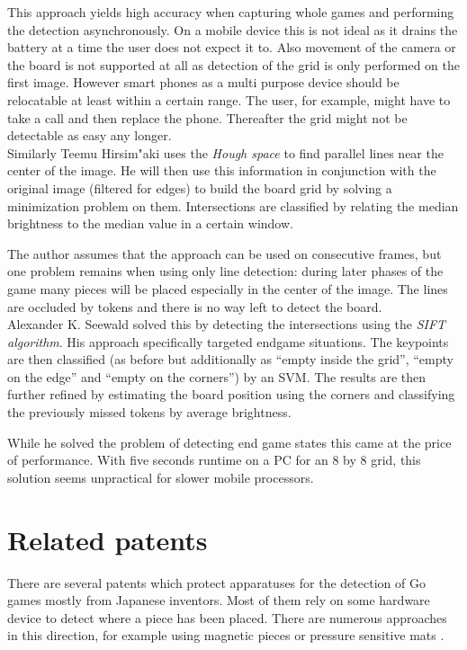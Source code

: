 	This approach yields high accuracy when capturing whole games and performing the detection asynchronously. On a mobile device this is not ideal as it drains the battery at a time the user does not expect it to. Also movement of the camera or the board is not supported at all as detection of the grid is only performed on the first image. However smart phones as a multi purpose device should be relocatable at least within a certain range. The user, for example, might have to take a call and then replace the phone. Thereafter the grid might not be detectable as easy any longer.
	\\

	Similarly Teemu Hirsim"aki \cite{hirsimaki2005extracting} uses the \emph{Hough space} to find parallel lines near the center of the image. He will then use this information in conjunction with the original image (filtered for edges) to build the board grid by solving a minimization problem on them. Intersections are classified by relating the median brightness to the median value in a certain window.

	The author assumes that the approach can be used on consecutive frames, but one problem remains when using only line detection: during later phases of the game many pieces will be placed especially in the center of the image. The lines are occluded by tokens and there is no way left to detect the board.
	\\

	Alexander K. Seewald \cite{seewald2010automatic} solved this by detecting the intersections using the \emph{SIFT algorithm}. His approach specifically targeted endgame situations. The keypoints are then classified (as before but additionally as ``empty inside the grid'', ``empty on the edge'' and ``empty on the corners'') by an SVM. The results are then further refined by estimating the board position using the corners and classifying the previously missed tokens by average brightness.

	While he solved the problem of detecting end game states this came at the price of performance. With five seconds runtime on a PC for an 8 by 8 grid, this solution seems unpractical for slower mobile processors.

	\section{Related patents}
	\label{introduction-patents}

	There are several patents which protect apparatuses for the detection of Go games mostly from Japanese inventors. Most of them rely on some hardware device to detect where a piece has been placed. There are numerous approaches in this direction, for example using magnetic pieces \cite{JPH11114129A} or pressure sensitive mats \cite{JP2002000792A}.

